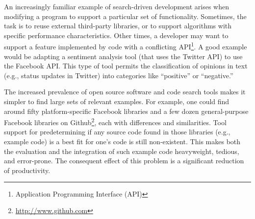 An increasingly familiar example of search-driven development arises when modifying a program to support a particular set of functionality. Sometimes, the task is to reuse external third-party libraries, or to support algorithms with specific performance characteristics. Other times, a developer may want to support a feature implemented by code with a conflicting API\footnote{Application Programming Interface (API)}. A good example would be adapting a sentiment analysis tool (that uses the Twitter API) to use the Facebook API. This type of tool permits the classification of opinions in text (e.g., status updates in Twitter) into categories like ``positive'' or ``negative.'' 

The increased prevalence of open source software and code search tools makes it simpler to find large sets of relevant examples. For example, one could find around fifty platform-specific Facebook libraries and a few dozen general-purpose Facebook libraries on Github\footnote{\url{http://www.github.com}}, each with differences and similarities. Tool support for predetermining if any source code found in those libraries (e.g., example code) is a best fit for one's code is still non-existent. This makes both the evaluation and the integration of such example code heavyweight, tedious, and error-prone. The consequent effect of this problem is a significant reduction of productivity.

